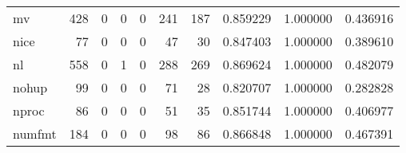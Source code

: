 \begin{tabular}{lrrrrrrrrr}
mv        &                                   428 &                                                  0 &                                                  0 &                                                  0 &                                                241 &                                                187 &                                           0.859229 &                               1.000000 &                             0.436916 \\
nice      &                                    77 &                                                  0 &                                                  0 &                                                  0 &                                                 47 &                                                 30 &                                           0.847403 &                               1.000000 &                             0.389610 \\
nl        &                                   558 &                                                  0 &                                                  1 &                                                  0 &                                                288 &                                                269 &                                           0.869624 &                               1.000000 &                             0.482079 \\
nohup     &                                    99 &                                                  0 &                                                  0 &                                                  0 &                                                 71 &                                                 28 &                                           0.820707 &                               1.000000 &                             0.282828 \\
nproc     &                                    86 &                                                  0 &                                                  0 &                                                  0 &                                                 51 &                                                 35 &                                           0.851744 &                               1.000000 &                             0.406977 \\
numfmt    &                                   184 &                                                  0 &                                                  0 &                                                  0 &                                                 98 &                                                 86 &                                           0.866848 &                               1.000000 &                             0.467391 \\

\end{tabular}
